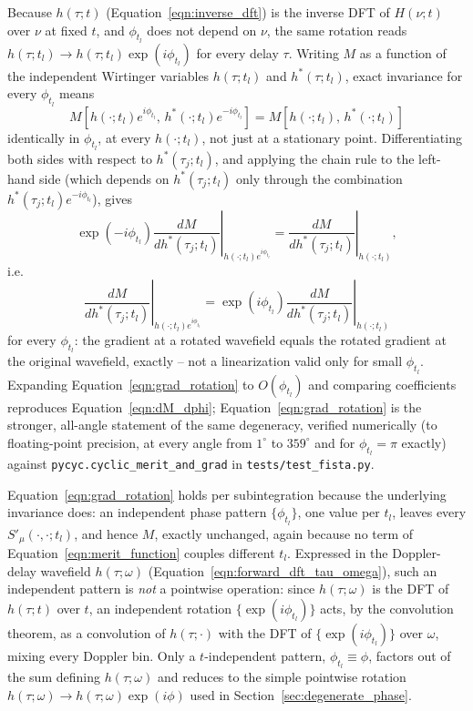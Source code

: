 \documentclass[manuscript]{aastex631}
\newcommand{\Eqn}[1]{Equation~\ref{eqn:#1}}
\begin{document}
Because $h(\tau;t)$ (\Eqn{inverse_dft}) is the inverse DFT of $H(\nu;t)$ over $\nu$ at fixed $t$,
and $\phi_{t_l}$ does not depend on $\nu$, the same rotation reads
$h(\tau;t_l) \to h(\tau;t_l)\exp(i\phi_{t_l})$ for every delay $\tau$. Writing $M$ as a function of
the independent Wirtinger variables $h(\tau;t_l)$ and $h^*(\tau;t_l)$, exact invariance for every
$\phi_{t_l}$ means
\begin{equation}
M\!\left[h(\cdot;t_l)e^{i\phi_{t_l}},\, h^*(\cdot;t_l)e^{-i\phi_{t_l}}\right]
= M\!\left[h(\cdot;t_l),\, h^*(\cdot;t_l)\right]
\label{eqn:M_gauge_invariant}
\end{equation}
identically in $\phi_{t_l}$, at every $h(\cdot;t_l)$, not just at a stationary point. Differentiating
both sides with respect to $h^*(\tau_j;t_l)$, and applying the chain rule to the left-hand side
(which depends on $h^*(\tau_j;t_l)$ only through the combination $h^*(\tau_j;t_l)e^{-i\phi_{t_l}}$),
gives
\begin{equation}
\exp(-i\phi_{t_l}) \left.\frac{dM}{dh^*(\tau_j;t_l)}\right|_{h(\cdot;t_l)e^{i\phi_{t_l}}}
= \left.\frac{dM}{dh^*(\tau_j;t_l)}\right|_{h(\cdot;t_l)},
\end{equation}
i.e.
\begin{equation}
\left.\frac{dM}{dh^*(\tau_j;t_l)}\right|_{h(\cdot;t_l)e^{i\phi_{t_l}}}
= \exp(i\phi_{t_l}) \left.\frac{dM}{dh^*(\tau_j;t_l)}\right|_{h(\cdot;t_l)}
\label{eqn:grad_rotation}
\end{equation}
for every $\phi_{t_l}$: the gradient at a rotated wavefield equals the rotated gradient at the
original wavefield, exactly -- not a linearization valid only for small $\phi_{t_l}$. Expanding
\Eqn{grad_rotation} to $O(\phi_{t_l})$ and comparing coefficients reproduces \Eqn{dM_dphi};
\Eqn{grad_rotation} is the stronger, all-angle statement of the same degeneracy, verified
numerically (to floating-point precision, at every angle from $1^\circ$ to $359^\circ$ and for
$\phi_{t_l}=\pi$ exactly) against \texttt{pycyc.cyclic\_merit\_and\_grad} in
\texttt{tests/test\_fista.py}.

\Eqn{grad_rotation} holds per subintegration because the underlying invariance does: an
independent phase pattern $\{\phi_{t_l}\}$, one value per $t_l$, leaves every
$S'_\mu(\cdot,\cdot;t_l)$, and hence $M$, exactly unchanged, again because no term of
\Eqn{merit_function} couples different $t_l$. Expressed in the Doppler-delay wavefield
$h(\tau;\omega)$ (\Eqn{forward_dft_tau_omega}), such an independent pattern is \emph{not} a
pointwise operation: since $h(\tau;\omega)$ is the DFT of $h(\tau;t)$ over $t$, an independent
rotation $\{\exp(i\phi_{t_l})\}$ acts, by the convolution theorem, as a convolution of
$h(\tau;\cdot)$ with the DFT of $\{\exp(i\phi_{t_l})\}$ over $\omega$, mixing every Doppler bin.
Only a $t$-independent pattern, $\phi_{t_l}\equiv\phi$, factors out of the sum defining
$h(\tau;\omega)$ and reduces to the simple pointwise rotation $h(\tau;\omega) \to
h(\tau;\omega)\exp(i\phi)$ used in Section~\ref{sec:degenerate_phase}.
\end{document}
